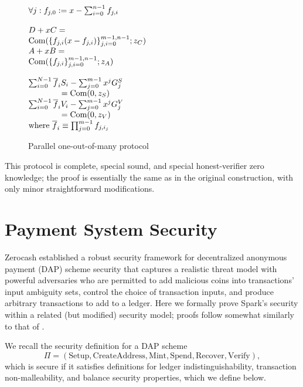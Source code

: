 \documentclass{llncs}
\newcommand{\com}{\operatorname{Com}}
\begin{document}
\begin{figure}
\begin{math}
\begin{array}{@{}l@{}c@{}l@{}}
&& \forall j: f_{j,0} := x - \sum_{i=0}^{n-1} f_{j,i} \\\\
&& D+xC =  \\
&& \com( \lbrace f_{j,i}(x - f_{j,i})\rbrace_{j,i=0}^{m-1,n-1}; z_C) \\
&& A+xB =  \\
&& \com( \lbrace f_{j,i} \rbrace_{j,i=0}^{m-1,n-1};z_A) \\\\
&& \sum_{i=0}^{N-1}\overline{f}_i S_i - \sum_{j=0}^{m-1} x^j G^S_j \\
&& \qquad \qquad = \com(0, z_S) \\
& & \sum_{i=0}^{N-1}\overline{f}_i V_i - \sum_{j=0}^{m-1} x^j G^V_j \\
& & \qquad \qquad = \com(0, z_V) \\
&&  \text{where } \overline{f}_i \equiv \prod_{j=0}^{m-1} f_{j,i_j}
\end{array}
\end{math}
\caption{Parallel one-out-of-many protocol}
\label{fig:groth}
\end{figure}

This protocol is complete, special sound, and special honest-verifier zero knowledge; the proof is essentially the same as in the original construction, with only minor straightforward modifications.


\section{Payment System Security}
 
Zerocash \cite{zerocash} established a robust security framework for decentralized anonymous payment (DAP) scheme security that captures a realistic threat model with powerful adversaries who are permitted to add malicious coins into transactions' input ambiguity sets, control the choice of transaction inputs, and produce arbitrary transactions to add to a ledger.
Here we formally prove Spark's security within a related (but modified) security model; proofs follow somewhat similarly to that of \cite{zerocash}.

We recall the security definition for a DAP scheme $$\Pi = (\text{Setup}, \text{CreateAddress}, \text{Mint}, \text{Spend}, \text{Recover}, \text{Verify}),$$ which is secure if it satisfies definitions for ledger indistinguishability, transaction non-malleability, and balance security properties, which we define below.
\end{document}
